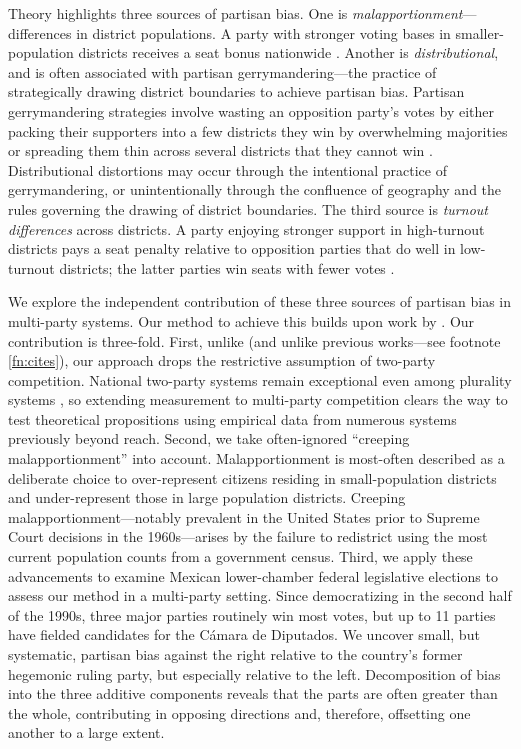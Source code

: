 \documentclass[letter,12pt]{article}
\begin{document}
Theory highlights three sources of partisan bias. One is \emph{malapportionment}---differences in district populations. A party with stronger voting bases in smaller-population districts receives a seat bonus nationwide \citep{JohnstonCreepingMal,jackmanMeasuringBias1994}. Another is \emph{distributional}, and is often associated with partisan gerrymandering---the practice of strategically drawing district boundaries to achieve partisan bias. Partisan gerrymandering strategies involve wasting an opposition party's votes by either packing their supporters into a few districts they win by overwhelming majorities or spreading them thin across several districts that they cannot win \citep{owen.grofman.1988.partisangerrymandering,cox.katz.2002,engstrom2006redisttrictApsr}. Distributional distortions may occur through the intentional practice of gerrymandering, or unintentionally through the confluence of geography and the rules governing the drawing of district boundaries. The third source is \emph{turnout differences} across districts. A party enjoying stronger support in high-turnout districts pays a seat penalty relative to opposition parties that do well in low-turnout districts; the latter parties win seats with fewer votes \citep{campbellTurnoutBias1996,rosenstone.hansen.1993}.  

We explore the independent contribution of these three sources of partisan bias in multi-party systems. Our method to achieve this builds upon work by \citet{grofman.etalBiasMalapp.1997}. Our contribution is three-fold. First, unlike \citeauthor{grofman.etalBiasMalapp.1997} (and unlike previous works---see footnote \ref{fn:cites}), our approach drops the restrictive assumption of two-party competition. National two-party systems remain exceptional even among plurality systems \citep{cox.1997}, so extending measurement to multi-party competition clears the way to test theoretical propositions using empirical data from numerous systems previously beyond reach. Second, we take often-ignored ``creeping malapportionment'' \citep{JohnstonCreepingMal} into account. Malapportionment is most-often described as a deliberate choice to over-represent citizens residing in small-population districts and under-represent those in large population districts. Creeping malapportionment---notably prevalent in the United States prior to Supreme Court decisions in the 1960s---arises by the failure to redistrict using the most current population counts from a government census. Third, we apply these advancements to examine Mexican lower-chamber federal legislative elections to assess our method in a multi-party setting. Since democratizing in the second half of the 1990s, three major parties routinely win most votes, but up to 11 parties have fielded candidates for the C\'amara de Diputados. We uncover small, but systematic, partisan bias against the right relative to the country's former hegemonic ruling party, but especially relative to the left. Decomposition of bias into the three additive components reveals that the parts are often greater than the whole, contributing in opposing directions and, therefore, offsetting one another to a large extent. 
\end{document}
